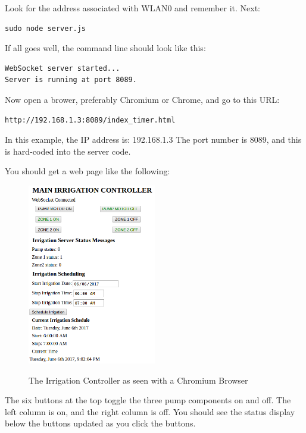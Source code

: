 Look for the address associated with WLAN0 and remember it.  Next:

\begin{verbatim}
sudo node server.js
\end{verbatim}

If all goes well, the command line should look like this:

\begin{verbatim}
WebSocket server started...
Server is running at port 8089.
\end{verbatim}

Now open a brower, preferably Chromium or Chrome, and go to this URL:

\begin{verbatim}
http://192.168.1.3:8089/index_timer.html
\end{verbatim}

In this example, the IP address is: 192.168.1.3
The port number is 8089, and this is hard-coded into the server code.

You should get a web page like the following:

\begin{figure}[h]
	\centering
    \includegraphics[width=0.5\textwidth]{photos/browser_full.png}
	\centering\bfseries
	\caption{The Irrigation Controller as seen with a Chromium Browser}
\end{figure}

The six buttons at the top toggle the three pump components on and off.  The 
left column is on, and the right column is off.  You should see the status 
display below the buttons updated as you click the buttons.

